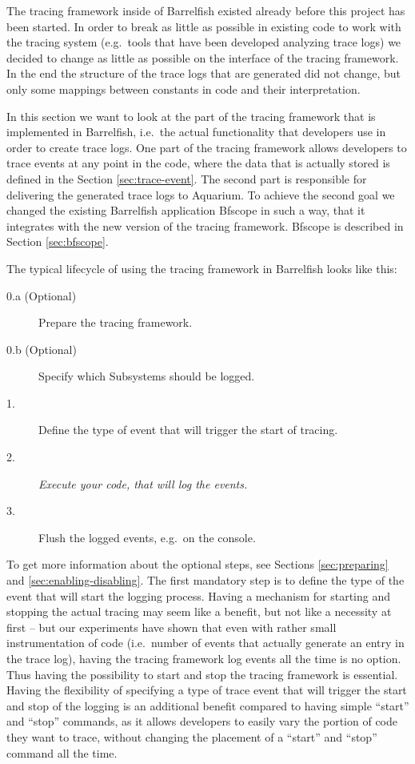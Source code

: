 \documentclass[a4paper,11pt,twoside]{report}
\begin{document}
The tracing framework inside of Barrelfish existed already before this project
has been started. In order to break as little as possible in existing code to
work with the tracing system (e.g.~tools that have been developed analyzing
trace logs) we decided to change as little as possible on the interface of the
tracing framework. In the end the structure of the trace logs that are generated
did not change, but only some mappings between constants in code and their
interpretation. 

In this section we want to look at the part of the tracing framework that is
implemented in Barrelfish, i.e.~the actual functionality that developers use in
order to create trace logs. One part of the tracing framework allows developers
to trace events at any point in the code, where the data that is actually stored
is defined in the Section \ref{sec:trace-event}. The second part is responsible
for delivering the generated trace logs to Aquarium. To achieve the second goal
we changed the existing Barrelfish application Bfscope in such a way, that it
integrates with the new version of the tracing framework. Bfscope is described
in Section \ref{sec:bfscope}.

The typical lifecycle of using the tracing framework in Barrelfish looks like
this:

\begin{description}
	\item[0.a (Optional)] Prepare the tracing framework.
	\item[0.b (Optional)] Specify which Subsystems should be logged.
	\item[1.] Define the type of event that will trigger the start of tracing.
	\item[2.] \emph{Execute your code, that will log the events.}
	\item[3.] Flush the logged events, e.g.~on the console.
\end{description}

To get more information about the optional steps, see Sections
\ref{sec:preparing} and \ref{sec:enabling-disabling}. The first mandatory step
is to define the type of the event that will start the logging process. Having a
mechanism for starting and stopping the actual tracing may seem like a benefit,
but not like a necessity at first -- but our experiments have shown that even
with rather small instrumentation of code (i.e.~number of events that actually
generate an entry in the trace log), having the tracing framework log events all
the time is no option. Thus having the possibility to start and stop the tracing
framework is essential. Having the flexibility of specifying a type of trace
event that will trigger the start and stop of the logging is an additional
benefit compared to having simple ``start'' and ``stop'' commands, as it allows
developers to easily vary the portion of code they want to trace, without
changing the placement of a ``start'' and ``stop'' command all the time.
\end{document}
